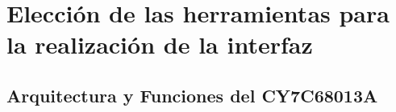 \chapter{Elección de las herramientas para la realización de la interfaz}
		
	\section{Arquitectura y Funciones del CY7C68013A}
		


	
%		
%		
%		
		